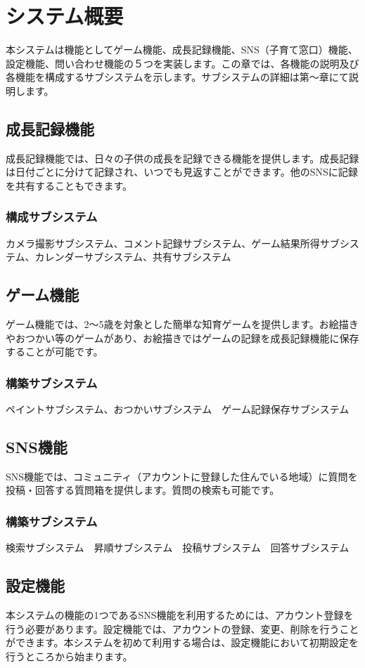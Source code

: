 \documentclass[a4j]{jarticle}
\begin{document}
 
\section{システム概要} 
本システムは機能としてゲーム機能、成長記録機能、SNS（子育て窓口）機能、設定機能、問い合わせ機能の５つを実装します。この章では、各機能の説明及び各機能を構成するサブシステムを示します。サブシステムの詳細は第〜章にて説明します。 

\subsection{成長記録機能} 
成長記録機能では、日々の子供の成長を記録できる機能を提供します。成長記録は日付ごとに分けて記録され、いつでも見返すことができます。他のSNSに記録を共有することもできます。 
\subsubsection*{構成サブシステム} 
\noindent カメラ撮影サブシステム、コメント記録サブシステム、ゲーム結果所得サブシステム、カレンダーサブシステム、共有サブシステム 

\subsection{ゲーム機能}
ゲーム機能では、2〜5歳を対象とした簡単な知育ゲームを提供します。お絵描きやおつかい等のゲームがあり、お絵描きではゲームの記録を成長記録機能に保存することが可能です。
\subsubsection*{構築サブシステム}
\noindent ペイントサブシステム、おつかいサブシステム　ゲーム記録保存サブシステム

\subsection{SNS機能}
SNS機能では、コミュニティ（アカウントに登録した住んでいる地域）に質問を投稿・回答する質問箱を提供します。質問の検索も可能です。
\subsubsection*{構築サブシステム}
\noindent 検索サブシステム　昇順サブシステム　投稿サブシステム　回答サブシステム

\subsection{設定機能} 
本システムの機能の1つであるSNS機能を利用するためには、アカウント登録を行う必要があります。設定機能では、アカウントの登録、変更、削除を行うことができます。本システムを初めて利用する場合は、設定機能において初期設定を行うところから始まります。 
\end{document}
